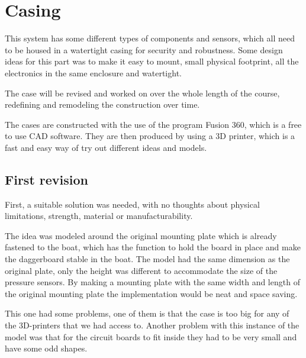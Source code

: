 
\section{Casing}
This system has some different types of components and sensors, which all need to be housed in a watertight casing for security and robustness. Some design ideas for this part was to make it easy to mount, small physical footprint, all the electronics in the same enclosure and watertight.  

The case will be revised and worked on over the whole length of the course, redefining and remodeling the construction over time.  

The cases are constructed with the use of the program Fusion 360, which is a free to use CAD software. They are then produced by using a 3D printer, which is a fast and easy way of try out different ideas and models.   

\subsection{First revision}
First, a suitable solution was needed, with no thoughts about physical limitations, strength, material or manufacturability.  

The idea was modeled around the original mounting plate which is already fastened to the boat, which has the function to hold the board in place and make the daggerboard stable in the boat. The model had the same dimension as the original plate, only the height was different to accommodate the size of the pressure sensors. By making a mounting plate with the same width and length of the original mounting plate the implementation would be neat and space saving. 

This one had some problems, one of them is that the case is too big for any of the 3D-printers that we had access to. Another problem with this instance of the model was that for the circuit boards to fit inside they had to be very small and have some odd shapes.  



